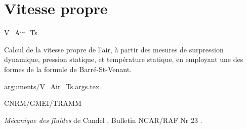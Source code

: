 %
\section{Vitesse propre}

 {\sf V\_Air\_Ts}

Calcul de la vitesse propre de l'air, \`a 
partir des mesures de surpression dynamique, pression 
statique, et temp\'erature statique, en employant 
une des formes de la formule de Barr\'e-St-Venant.

\bigskip
 {arguments/V_Air_Ts.args.tex}




CNRM/GMEI/TRAMM

{\it M\'ecanique des fluides} de Candel \cite{Candel},
Bulletin NCAR/RAF Nr 23 \cite{RAF-23}.
